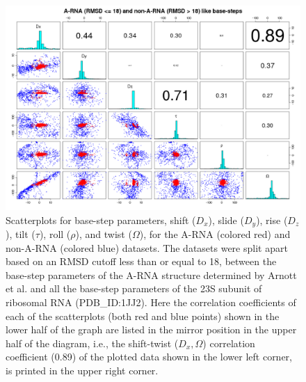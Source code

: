 \begin{figure}
 \centering
\includegraphics[angle=90, scale=0.48]{Chapter2/warna_step.png}
\caption{Scatterplots for base-step parameters, shift ($D_{x}$), slide
  ($D_{y}$), rise  ($D_{z}$), tilt ($\tau$), roll  ($\rho$), and twist
  ($\Omega$), for the A-RNA (colored red) and non-A-RNA (colored blue)
  datasets.  The  datasets were  split apart based  on an  RMSD cutoff
  less than  or equal to 18,  between the base-step  parameters of the
  A-RNA structure  determined by Arnott et  al.  \cite{arnott1973} and
  all the  base-step parameters  of the 23S  subunit of  ribosomal RNA
  (PDB\_ID:1JJ2).  Here  the correlation  coefficients of each  of the
  scatterplots (both red  and blue points) shown in  the lower half of
  the graph are listed in the mirror position in the upper half of the
  diagram,  i.e.,   the  shift-twist  ($D_{x},   \Omega$)  correlation
  coefficient  (0.89) of  the plotted  data  shown in  the lower  left
  corner, is printed in the upper right corner.}
\label{fig:allsteps}
\end{figure}

